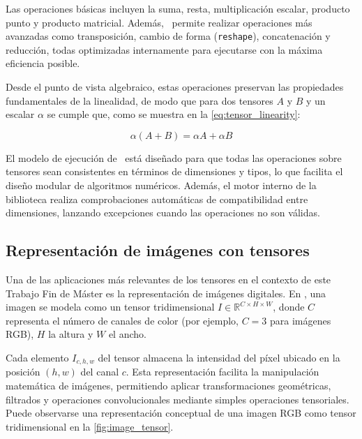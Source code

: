Las operaciones básicas incluyen la suma, resta, multiplicación escalar, producto punto y producto matricial. Además, \pytorch\
permite realizar operaciones más avanzadas como transposición, cambio de forma (\texttt{reshape}), concatenación y reducción,
todas optimizadas internamente para ejecutarse con la máxima eficiencia posible.

Desde el punto de vista algebraico, estas operaciones preservan las propiedades fundamentales de la linealidad, de modo que
para dos tensores $A$ y $B$ y un escalar $\alpha$ se cumple que, como se muestra en la \autoref{eq:tensor_linearity}:

\begin{myequation}
	\begin{equation}
		\alpha(A + B) = \alpha A + \alpha B
		\label{eq:tensor_linearity}
	\end{equation}
	\caption{Propiedad de linealidad en operaciones con tensores}
\end{myequation}

El modelo de ejecución de \pytorch\ está diseñado para que todas las operaciones sobre tensores sean consistentes en
términos de dimensiones y tipos, lo que facilita el diseño modular de algoritmos numéricos. Además, el motor interno de la
biblioteca realiza comprobaciones automáticas de compatibilidad entre dimensiones, lanzando excepciones cuando las operaciones
no son válidas.

\newpage
\subsection{Representación de imágenes con tensores} \label{sec:intro_image_tensors}
Una de las aplicaciones más relevantes de los tensores en el contexto de este Trabajo Fin de Máster es la representación de imágenes digitales.
En \pytorch, una imagen se modela como un tensor tridimensional $I \in \mathbb{R}^{C \times H \times W}$, donde $C$
representa el número de canales de color (por ejemplo, $C = 3$ para imágenes RGB), $H$ la altura y $W$ el ancho.

Cada elemento $I_{c,h,w}$ del tensor almacena la intensidad del píxel ubicado en la posición $(h, w)$ del canal $c$. Esta representación
facilita la manipulación matemática de imágenes, permitiendo aplicar transformaciones geométricas, filtrados y operaciones convolucionales
mediante simples operaciones tensoriales. Puede observarse una representación conceptual de una imagen RGB como tensor tridimensional en la
\autoref{fig:image_tensor}.


